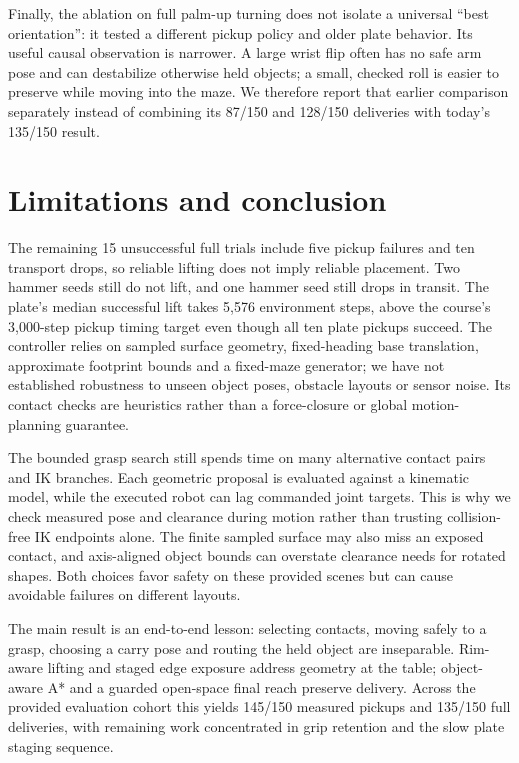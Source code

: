 \documentclass[10pt,a4paper]{article}
\begin{document}
Finally, the ablation on full palm-up turning does not isolate a universal
``best orientation'': it tested a different pickup policy and older plate
behavior. Its useful causal observation is narrower. A large wrist flip
often has no safe arm pose and can destabilize otherwise held objects; a
small, checked roll is easier to preserve while moving into the maze. We
therefore report that earlier comparison separately instead of combining
its 87/150 and 128/150 deliveries with today's 135/150 result.

\section{Limitations and conclusion}
The remaining 15 unsuccessful full trials include five pickup failures and
ten transport drops, so reliable lifting does not imply reliable placement.
Two hammer seeds still do not lift, and one hammer seed still drops in transit.
The plate's median successful lift takes 5,576 environment steps, above the
course's 3,000-step pickup timing target even though all ten plate pickups
succeed. The controller relies on sampled surface geometry, fixed-heading
base translation, approximate footprint bounds and a fixed-maze generator;
we have not established robustness to unseen object poses, obstacle layouts
or sensor noise. Its contact checks are heuristics rather than a force-closure
or global motion-planning guarantee.

The bounded grasp search still spends time on many alternative contact
pairs and IK branches. Each geometric proposal is evaluated against a
kinematic model, while the executed robot can lag commanded joint targets.
This is why we check measured pose and clearance during motion rather than
trusting collision-free IK endpoints alone. The finite sampled surface may
also miss an exposed contact, and axis-aligned object bounds can overstate
clearance needs for rotated shapes. Both choices favor safety on these
provided scenes but can cause avoidable failures on different layouts.

The main result is an end-to-end lesson: selecting contacts, moving safely to
a grasp, choosing a carry pose and routing the held object are inseparable.
Rim-aware lifting and staged edge exposure address geometry at the table;
object-aware A* and a guarded open-space final reach preserve delivery.
Across the provided evaluation cohort this yields 145/150 measured pickups
and 135/150 full deliveries, with remaining work concentrated in grip
retention and the slow plate staging sequence.
\end{document}
